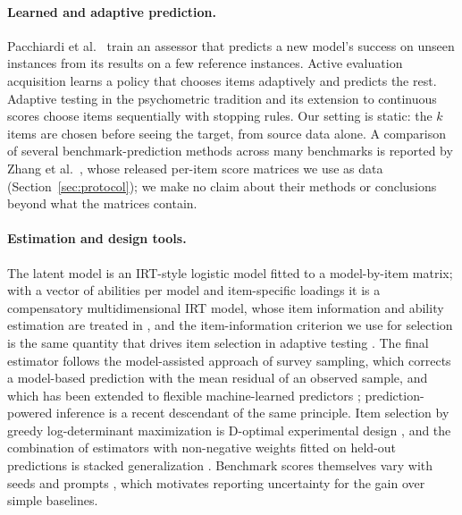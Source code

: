 \documentclass{article}
\begin{document}
\paragraph{Learned and adaptive prediction.} Pacchiardi et al.\ \citep{Pacchiardi2024100II} train an assessor that predicts a new model's success on unseen instances from its results on a few reference instances. Active evaluation acquisition \citep{Li2024ActiveEA} learns a policy that chooses items adaptively and predicts the rest. Adaptive testing in the psychometric tradition \citep{Zhuang2023PositionAE} and its extension to continuous scores \citep{Balkir2026ConfidentRW} choose items sequentially with stopping rules. Our setting is static: the $k$ items are chosen before seeing the target, from source data alone. A comparison of several benchmark-prediction methods across many benchmarks is reported by Zhang et al.\ \citep{Zhang2025HowBP}, whose released per-item score matrices we use as data (Section~\ref{sec:protocol}); we make no claim about their methods or conclusions beyond what the matrices contain.

\paragraph{Estimation and design tools.} The latent model is an IRT-style logistic model \citep{Rodriguez2021EvaluationEA} fitted to a model-by-item matrix; with a vector of abilities per model and item-specific loadings it is a compensatory multidimensional IRT model, whose item information and ability estimation are treated in \citet{Reckase2009MultidimensionalIR}, and the item-information criterion we use for selection is the same quantity that drives item selection in adaptive testing \citep{Zhuang2023PositionAE}. The final estimator follows the model-assisted approach of survey sampling, which corrects a model-based prediction with the mean residual of an observed sample, and which has been extended to flexible machine-learned predictors \citep{Breidt2017ModelAssistedSE}; prediction-powered inference \citep{Angelopoulos2023PredictionpoweredI} is a recent descendant of the same principle. Item selection by greedy log-determinant maximization is D-optimal experimental design \citep{Kiefer1960TheEO}, and the combination of estimators with non-negative weights fitted on held-out predictions is stacked generalization \citep{Wolpert1992StackedG}. Benchmark scores themselves vary with seeds and prompts \citep{Madaan2024QuantifyingVI}, which motivates reporting uncertainty for the gain over simple baselines.
\end{document}
